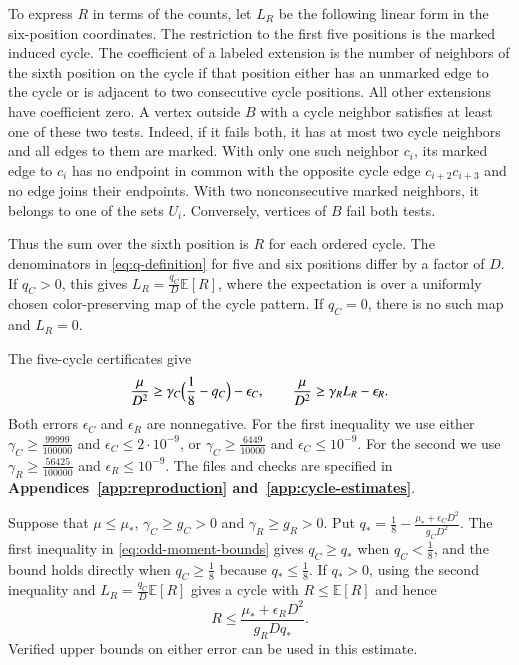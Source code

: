 

To express $R$ in terms of the counts, let $L_R$ be the following
linear form in the six-position coordinates. The restriction to the
first five positions is the marked induced cycle. The coefficient
of a labeled extension is the number of neighbors of the sixth
position on the cycle if that position either has an unmarked edge
to the cycle or is adjacent to two consecutive cycle positions.
All other extensions have coefficient zero. A vertex outside $B$
with a cycle neighbor satisfies at least one of these two tests.
Indeed, if it fails both, it has at most two cycle neighbors and
all edges to them are marked. With only one such neighbor $c_i$,
its marked edge to $c_i$ has no endpoint in common with the
opposite cycle edge $c_{i+2}c_{i+3}$ and no edge joins their endpoints.
With two nonconsecutive marked neighbors, it belongs to one of
the sets $U_i$. Conversely, vertices of $B$ fail both tests.

Thus the sum over the sixth position is $R$ for each ordered
cycle. The denominators in \eqref{eq:q-definition} for five and
six positions differ by a factor of $D$. If $q_C>0$, this gives
$L_R=\frac{q_C}{D}\mathbb E[R]$, where the expectation is over a
uniformly chosen color-preserving map of the cycle pattern. If $q_C=0$,
there is no such map and $L_R=0$.

The five-cycle certificates give
\begin{equation}\label{eq:odd-moment-bounds}
 \frac{\mu}{D^2}\geq\gamma_C\Bigl(\frac{1}{8}-q_C\Bigr)-\epsilon_C,
 \qquad
 \frac{\mu}{D^2}\geq\gamma_R L_R-\epsilon_R.
\end{equation}
Both errors $\epsilon_C$ and $\epsilon_R$ are nonnegative. For the
first inequality we use either
$\gamma_C\geq\frac{99999}{100000}$ and $\epsilon_C\leq2\cdot10^{-9}$,
or $\gamma_C\geq\frac{6449}{10000}$ and $\epsilon_C\leq10^{-9}$.
For the second we use $\gamma_R\geq\frac{56425}{100000}$ and
$\epsilon_R\leq10^{-9}$. The files and checks are specified in
\textbf{Appendices~\ref{app:reproduction} and~\ref{app:cycle-estimates}}.

Suppose that $\mu\leq\mu_*$, $\gamma_C\geq g_C>0$ and
$\gamma_R\geq g_R>0$. Put
$q_*=\frac{1}{8}-\frac{\mu_*+\epsilon_C D^2}{g_C D^2}$.
The first inequality in \eqref{eq:odd-moment-bounds} gives
$q_C\geq q_*$ when $q_C<\frac{1}{8}$, and the bound holds directly
when $q_C\geq\frac{1}{8}$ because $q_*\leq\frac{1}{8}$. If $q_*>0$,
using the second inequality and $L_R=\frac{q_C}{D}\mathbb E[R]$
gives a cycle with $R\leq\mathbb E[R]$ and hence
\begin{equation}\label{eq:odd-choose-anchor}
 R\leq\frac{\mu_*+\epsilon_R D^2}{g_R Dq_*}.
\end{equation}
Verified upper bounds on either error can be used in this estimate.

